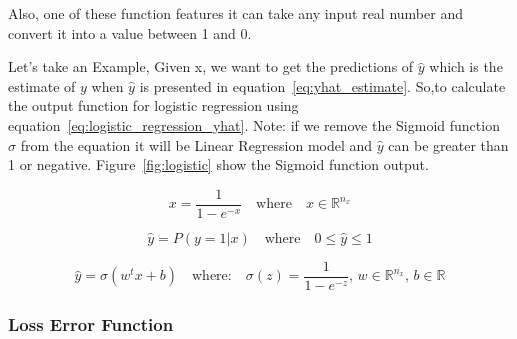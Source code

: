 Also, one of these function features it can take any input real number and convert it into a value between 1 and 0.



Let's take an Example, Given x, we want to get the predictions of $\widehat{y}$ which is the estimate of $y$  when $\widehat{y}$  is presented in equation~\eqref{eq:yhat_estimate}. So,to calculate the output function for logistic regression using equation~\eqref{eq:logistic_regression_yhat}. Note: if we remove the Sigmoid function $\sigma$ from the equation it will be Linear Regression model and $\widehat{y}$ can be greater than 1 or negative. Figure~\ref{fig:logistic} show the Sigmoid function output. 

\begin{equation}\label{eq:logistic_function}
  x = \frac{1}{1-e^{-x}} \quad \text{where} \quad x \in \mathbb{R}^{n_x} 
\end{equation}

\begin{equation}
  \label{eq:yhat_estimate}
    \widehat{y} = P(y=1 | x) \quad \text{where}  \quad 0 \le \widehat{y}  \le 1
  \end{equation}

\begin{equation}
  \label{eq:logistic_regression_yhat}
  \widehat{y} = \sigma(w^t x + b)  \quad \text{where:} \quad  \sigma(z) = \frac{1}{1-e^{-z}} \text{, }  w \in  \mathbb{R}^{n_x} \text{, }  b \in  \mathbb{R}  
\end{equation}


\subsubsection{Loss Error Function}

